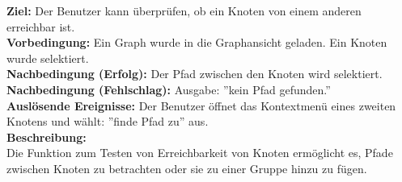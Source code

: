 \label{fa:erreichbarkeit}
\textbf{Ziel:} Der Benutzer kann überprüfen, ob ein Knoten von einem anderen erreichbar ist.\\
\textbf{Vorbedingung:} Ein Graph wurde in die Graphansicht geladen. Ein Knoten wurde selektiert.\\
\textbf{Nachbedingung (Erfolg):} Der Pfad zwischen den Knoten wird selektiert.\\
\textbf{Nachbedingung (Fehlschlag):} Ausgabe: ''kein Pfad gefunden.''\\
\textbf{Auslösende Ereignisse:} Der Benutzer öffnet das Kontextmenü eines zweiten Knotens und wählt: ''finde Pfad zu'' aus.\\
\textbf{Beschreibung:}\\
Die Funktion zum Testen von Erreichbarkeit von Knoten ermöglicht es, Pfade zwischen Knoten zu betrachten oder sie zu einer Gruppe hinzu zu fügen.\\

%
